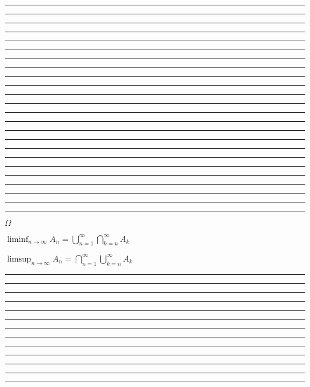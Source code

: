 \documentclass{article}
\begin{document}
\begin{flushleft}
\bigbreak
\hrule
\bigbreak
\textbf{}

\bigbreak
\hrule
\bigbreak
\textbf{}

\bigbreak
\hrule
\bigbreak
\textbf{}

\bigbreak
\hrule
\bigbreak
\textbf{}

\bigbreak
\hrule
\bigbreak
\textbf{}

\bigbreak
\hrule
\bigbreak
\textbf{}

\bigbreak
\hrule
\bigbreak
\textbf{}

\bigbreak
\hrule
\bigbreak
\textbf{}

\bigbreak
\hrule
\bigbreak
\textbf{}

\bigbreak
\hrule
\bigbreak
\textbf{}

\bigbreak
\hrule
\bigbreak
\textbf{}

\bigbreak
\hrule
\bigbreak
\textbf{}

\bigbreak
\hrule
\bigbreak
\textbf{}

\bigbreak
\hrule
\bigbreak
\textbf{}

\bigbreak
\hrule
\bigbreak
\textbf{}

\bigbreak
\hrule
\bigbreak
\textbf{}

\bigbreak
\hrule
\bigbreak
\textbf{}

\bigbreak
\hrule
\bigbreak
\textbf{}

\bigbreak
\hrule
\bigbreak
\textbf{}

\bigbreak
\hrule
\bigbreak
\textbf{}

\bigbreak
\hrule
\bigbreak
\textbf{}

\bigbreak
\hrule
\bigbreak
\textbf{}

\bigbreak
\hrule
\bigbreak
\textbf{}

\bigbreak
\hrule
\bigbreak
\textbf{}


$\Omega$

$\liminf_{n \rightarrow \infty} A_n = \bigcup_{n=1}^{\infty} \bigcap_{k=n}^{\infty} A_k$

$\limsup_{n \rightarrow \infty} A_n = \bigcap_{n=1}^{\infty} \bigcup_{k=n}^{\infty} A_k$

\bigbreak
\hrule
\bigbreak

\bigbreak
\hrule
\bigbreak

\bigbreak
\hrule
\bigbreak

\bigbreak
\hrule
\bigbreak

\bigbreak
\hrule
\bigbreak

\bigbreak
\hrule
\bigbreak

\bigbreak
\hrule
\bigbreak

\bigbreak
\hrule
\bigbreak

\bigbreak
\hrule
\bigbreak

\bigbreak
\hrule
\bigbreak

\bigbreak
\hrule
\bigbreak

\bigbreak
\hrule
\bigbreak

\bigbreak
\hrule
\bigbreak






\end{flushleft}
\end{document}
